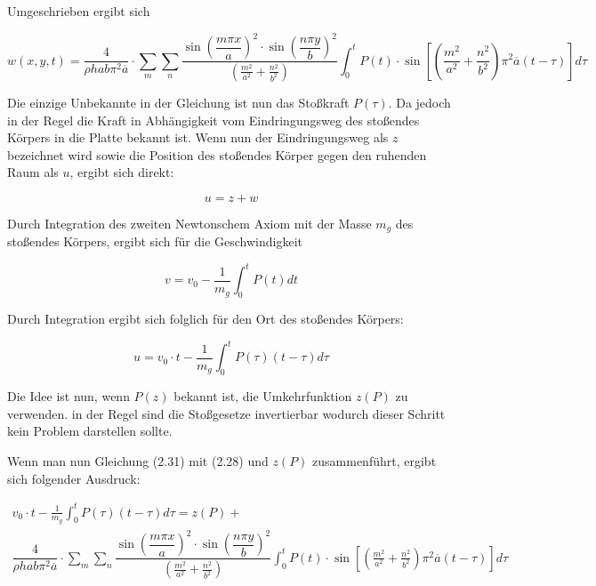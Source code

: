 Umgeschrieben ergibt sich

\begin{equation}
	w(x,y,t) = \dfrac{4}{\rho h a b \pi^2 \overline{a}} \cdot \sum_m \sum_n 
	\dfrac{\sin\left(\dfrac{m \pi x}{a}\right)^2 \cdot \sin\left(\dfrac{n \pi y}{b}\right)^2}{\left(\frac{m^2}{a^2} + \frac{n^2}{b^2} \right)} 
	\int_0^t
	P(t)\cdot \sin \left[ \left(\frac{m^2}{a^2} + \frac{n^2}{b^2} \right) \pi^2 \overline{a} (t-\tau)\right] d\tau
\end{equation}


Die einzige Unbekannte in der Gleichung ist nun das Stoßkraft $P(\tau)$. Da jedoch in der Regel die Kraft in Abhängigkeit vom Eindringungsweg des stoßendes Körpers in die Platte bekannt ist. Wenn nun der Eindringungsweg als $z$ bezeichnet wird sowie die Position des stoßendes Körper gegen den ruhenden Raum als $u$, ergibt sich direkt:

\begin{equation}
	u = z + w
\end{equation}


Durch Integration des zweiten Newtonschem Axiom mit der Masse $m_g$ des stoßendes Körpers, ergibt sich für die Geschwindigkeit 

\begin{equation}
	v = v_0 - \frac{1}{m_g} \int_0^t P(t) dt
\end{equation}

Durch Integration ergibt sich folglich für den Ort des stoßendes Körpers:

\begin{equation}
	u = v_0 \cdot t - \frac{1}{m_g} \int_0^t P(\tau) (t-\tau) d\tau
\end{equation}


Die Idee ist nun, wenn $P(z)$ bekannt ist, die Umkehrfunktion $z(P)$ zu verwenden. in der Regel sind die Stoßgesetze invertierbar wodurch dieser Schritt kein Problem darstellen sollte.

Wenn man nun Gleichung (2.31) mit (2.28) und $z(P)$ zusammenführt, ergibt sich folgender Ausdruck:


\begin{multline}
v_0 \cdot t - \frac{1}{m_g} \int_0^t P(\tau) (t-\tau) d\tau = z(P) + \\ \dfrac{4}{\rho h a b \pi^2 \overline{a}} \cdot \sum_m \sum_n 
\dfrac{\sin\left(\dfrac{m \pi x}{a}\right)^2 \cdot \sin\left(\dfrac{n \pi y}{b}\right)^2}{\left(\frac{m^2}{a^2} + \frac{n^2}{b^2} \right)} 
\int_0^t
P(t)\cdot \sin \left[ \left(\frac{m^2}{a^2} + \frac{n^2}{b^2} \right) \pi^2 \overline{a} (t-\tau)\right] d\tau
\end{multline}




